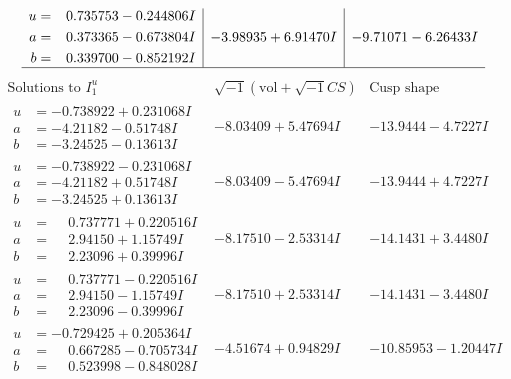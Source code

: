 \documentclass[1p]{elsarticle_modified}
\theoremstyle{definition}
\newcommand{\I}{\sqrt{-1}}
\begin{document}
$$\begin{array}{c|c|c}
\begin{aligned}
u &= \phantom{-}0.735753 - 0.244806 I \\
a &= \phantom{-}0.373365 - 0.673804 I \\
b &= \phantom{-}0.339700 - 0.852192 I\end{aligned}
 & -3.98935 + 6.91470 I & -9.71071 - 6.26433 I\\
 \hline 
 \end{array}$$\newpage$$\begin{array}{c|c|c}  
\text{Solutions to }I^u_{1}& \I (\text{vol} + \sqrt{-1}CS) & \text{Cusp shape}\\
 \hline 
\begin{aligned}
u &= -0.738922 + 0.231068 I \\
a &= -4.21182 - 0.51748 I \\
b &= -3.24525 - 0.13613 I\end{aligned}
 & -8.03409 + 5.47694 I & -13.9444 - 4.7227 I \\ \hline\begin{aligned}
u &= -0.738922 - 0.231068 I \\
a &= -4.21182 + 0.51748 I \\
b &= -3.24525 + 0.13613 I\end{aligned}
 & -8.03409 - 5.47694 I & -13.9444 + 4.7227 I \\ \hline\begin{aligned}
u &= \phantom{-}0.737771 + 0.220516 I \\
a &= \phantom{-}2.94150 + 1.15749 I \\
b &= \phantom{-}2.23096 + 0.39996 I\end{aligned}
 & -8.17510 - 2.53314 I & -14.1431 + 3.4480 I \\ \hline\begin{aligned}
u &= \phantom{-}0.737771 - 0.220516 I \\
a &= \phantom{-}2.94150 - 1.15749 I \\
b &= \phantom{-}2.23096 - 0.39996 I\end{aligned}
 & -8.17510 + 2.53314 I & -14.1431 - 3.4480 I \\ \hline\begin{aligned}
u &= -0.729425 + 0.205364 I \\
a &= \phantom{-}0.667285 - 0.705734 I \\
b &= \phantom{-}0.523998 - 0.848028 I\end{aligned}
 & -4.51674 + 0.94829 I & -10.85953 - 1.20447 I \\ \hline\begin{aligned}

\end{aligned}
\end{array}$$
\end{document}
